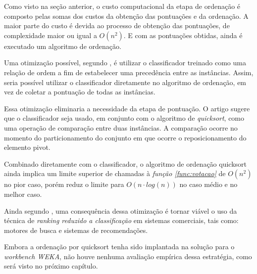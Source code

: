 Como visto na seção anterior, o custo computacional da etapa de ordenação é composto pelas somas dos custos da obtenção das pontuações e da ordenação. A maior parte do custo é devida ao processo de obtenção das pontuações, de complexidade maior ou igual a $O(n^2)$. E com as pontuações obtidas, ainda é executado um algoritmo de ordenação.

Uma otimização possível, segundo \cite{ailon08}, é utilizar o classificador treinado como uma relação de ordem a fim de estabelecer uma precedência entre as instâncias. Assim, seria possível utilizar o classificador diretamente no algoritmo de ordenação, em vez de coletar a pontuação de todas as instâncias.

Essa otimização eliminaria a necessidade da etapa de pontuação. O artigo sugere que o classificador seja usado, em conjunto com o algoritmo de \emph{quicksort}, como uma operação de comparação entre duas instâncias. A comparação ocorre no momento do particionamento do conjunto em que ocorre o reposicionamento do elemento pivot.

Combinado diretamente com o classificador, o algoritmo de ordenação quicksort ainda implica um limite superior de chamadas à \emph{função \ref{func:votacao}} de $O(n^2)$ no pior caso, porém reduz o limite para $O(n \cdot log(n))$ no caso médio e no melhor caso.

Ainda segundo \cite{ailon08}, uma consequência dessa otimização é tornar viável o uso da técnica de \emph{ranking reduzido a classificação} em sistemas comerciais, tais como: motores de busca e sistemas de recomendações.

Embora a ordenação por quicksort tenha sido implantada na solução para o \emph{workbench WEKA}, não houve nenhuma avaliação empírica dessa estratégia, como será visto no próximo capítulo.


